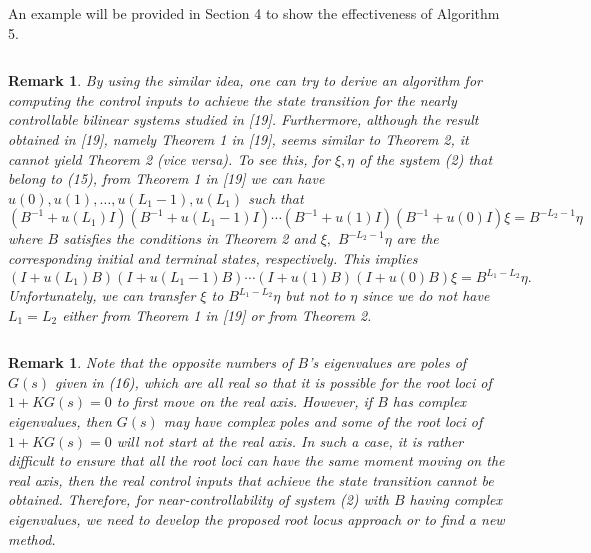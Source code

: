 \documentclass[journal,a4paper,12pt,onecolumn]{IEEEtran}
\newtheorem{remark}[theorem]{Remark}
\begin{document}
$\left. {}\right. $

An example will be provided in Section 4 to show the effectiveness of
Algorithm 5.

$\left. {}\right. $

\begin{remark}
By using the similar idea, one can try to derive an algorithm for computing
the control inputs to achieve the state transition for the nearly
controllable bilinear systems studied in [19]. Furthermore, although the
result obtained in [19], namely Theorem 1 in [19], seems similar to Theorem
2, it cannot yield Theorem 2 (vice versa). To see this, for $\xi ,\eta $ of
the system (2) that belong to (15), from Theorem 1 in [19] we can have $u(0),u(1),\ldots ,u(L_{1}-1),u\left( L_{1}\right) $ such that\begin{equation*}
\left( B^{-1}+u\left( L_{1}\right) I\right) \left( B^{-1}+u\left(
L_{1}-1\right) I\right) \cdots \left( B^{-1}+u\left( 1\right) I\right)
\left( B^{-1}+u\left( 0\right) I\right) \xi =B^{-L_{2}-1}\eta
\end{equation*}where $B$ satisfies the conditions in Theorem 2 and $\xi ,$ $B^{-L_{2}-1}\eta $ are the corresponding initial and terminal states,
respectively. This implies\begin{equation*}
\left( I+u\left( L_{1}\right) B\right) \left( I+u\left( L_{1}-1\right)
B\right) \cdots \left( I+u\left( 1\right) B\right) \left( I+u\left( 0\right)
B\right) \xi =B^{L_{1}-L_{2}}\eta .
\end{equation*}Unfortunately, we can transfer $\xi $ to $B^{L_{1}-L_{2}}\eta $ but not to $\eta $ since we do not have $L_{1}=L_{2}$ either from Theorem 1 in [19] or
from Theorem 2.
\end{remark}

$\left. {}\right. $

\begin{remark}
Note that the opposite numbers of $B$'s eigenvalues are poles of $G\left(
s\right) $ given in (16), which are all real so that it is possible for the
root loci of $1+KG\left( s\right) =0$ to first move on the real axis.
However, if $B$ has complex eigenvalues, then $G\left( s\right) $ may have
complex poles and some of the root loci of $1+KG\left( s\right) =0$ will not
start at the real axis. In such a case, it is rather difficult to ensure
that all the root loci can have the same moment moving on the real axis,
then the real control inputs that achieve the state transition cannot be
obtained. Therefore, for near-controllability of system (2) with $B$ having
complex eigenvalues, we need to develop the proposed root locus approach or
to find a new method.
\end{remark}
\end{document}
